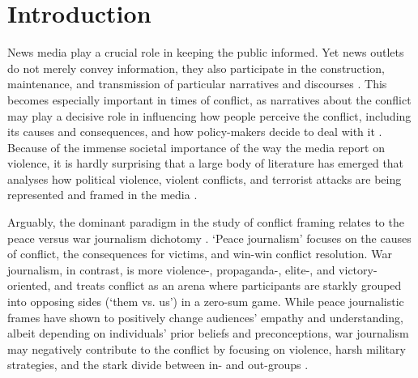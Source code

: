 \newpage


\section{Introduction}

News media play a crucial role in keeping the public informed. Yet news outlets do not merely convey information, they also participate in the construction, maintenance, and transmission of particular narratives and discourses \citep[][p. 152]{Tenenboim-Weinblatt2016}. This becomes especially important in times of conflict, as narratives about the conflict may play a decisive role in influencing how people perceive the conflict, including its causes and consequences, and how policy-makers decide to deal with it \citep{Wolfsfeld2004}. Because of the immense societal importance of the way the media report on violence, it is hardly surprising that a large body of literature has emerged that analyses how political violence, violent conflicts, and terrorist attacks are being represented and framed in the media \citep[e.g.,][]{Baden2017, Baden2018, Gonen2019, Wolfsfeld2004}.


Arguably, the dominant paradigm in the study of conflict framing relates to the peace versus war journalism dichotomy \citep{Galtung1985, Galtung1998, Galtung2006}. `Peace journalism' focuses on the causes of conflict, the consequences for victims, and win-win conflict resolution. War journalism, in contrast, is more violence-, propaganda-, elite-, and victory-oriented, and treats conflict as an arena where participants are starkly grouped into opposing sides (`them vs. us') in a zero-sum game. While peace journalistic frames have shown to positively change audiences' empathy and understanding, albeit depending on individuals' prior beliefs and preconceptions, war journalism may negatively contribute to the conflict by focusing on violence, harsh military strategies, and the stark divide between in- and out-groups \citep{Kempf2017,McGoldrick2016}.


